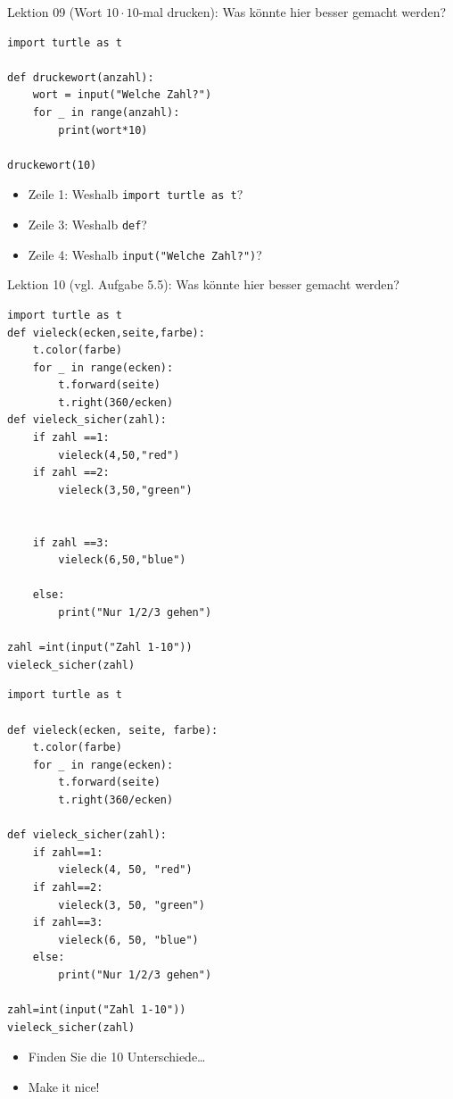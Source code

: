 \begin{frame}[fragile]{Lektion 09}
 (Wort $10\cdot 10$-mal drucken): Was könnte hier besser gemacht werden?
\begin{lstlisting}
import turtle as t

def druckewort(anzahl):
    wort = input("Welche Zahl?")
    for _ in range(anzahl):
        print(wort*10)

druckewort(10)
\end{lstlisting}
\begin{itemize}
    \item Zeile 1: Weshalb \lstinline|import turtle as t|?
    \item Zeile 3: Weshalb \lstinline|def|?
    \item Zeile 4: Weshalb \lstinline|input("Welche Zahl?")|?
\end{itemize}
\end{frame}


\begin{frame}[fragile]{Lektion 10}
 (vgl. Aufgabe 5.5): Was könnte hier besser gemacht werden?\\[-.5cm]
\begin{minipage}[t]{.45\textwidth}
    \begin{lstlisting}[basicstyle=\tiny\ttfamily]
import turtle as t
def vieleck(ecken,seite,farbe):
    t.color(farbe)
    for _ in range(ecken):
        t.forward(seite)
        t.right(360/ecken)
def vieleck_sicher(zahl):
    if zahl ==1:
        vieleck(4,50,"red")
    if zahl ==2:
        vieleck(3,50,"green")


    if zahl ==3:
        vieleck(6,50,"blue")

    else:
        print("Nur 1/2/3 gehen")

zahl =int(input("Zahl 1-10"))
vieleck_sicher(zahl)
\end{lstlisting}
\end{minipage}
\begin{minipage}[t]{.45\textwidth}
    \begin{lstlisting}[basicstyle=\tiny\ttfamily]
import turtle as t

def vieleck(ecken, seite, farbe):
    t.color(farbe)
    for _ in range(ecken):
        t.forward(seite)
        t.right(360/ecken)

def vieleck_sicher(zahl):
    if zahl==1:
        vieleck(4, 50, "red")
    if zahl==2:
        vieleck(3, 50, "green")
    if zahl==3:
        vieleck(6, 50, "blue")
    else:
        print("Nur 1/2/3 gehen")

zahl=int(input("Zahl 1-10"))
vieleck_sicher(zahl)
\end{lstlisting}
    \begin{itemize}
        \item Finden Sie die 10 Unterschiede\ldots
        \item Make it nice! 
    \end{itemize}
\end{minipage}
\end{frame}

